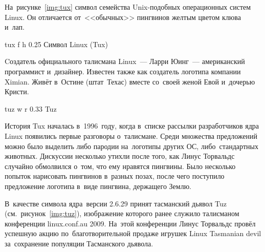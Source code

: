 \documentclass{bmstu}
\begin{document}



На~рисунке~\ref{img:tux} символ семейства Unix-подобных операционных систем Linux.
Он отличается от~<<обычных>> пингвинов желтым цветом клюва и~лап.

    {tux} %
    {f} %
    {h} %
    {0.25\textwidth} %
    {Символ Linux (Tux)} %

Cоздатель официального талисмана Linux~--- Ларри Юинг~--- американский программист и~дизайнер.
Известен также как создатель логотипа компании Ximian.
Живёт в~Остине (штат~Техас) вместе со~своей женой Евой и~дочерью Кристи.


    {tuz} %
    {w} %
    {r} %
    {0.33\textwidth} %
    {Tuz} %

История Tux началась в~1996~году, когда в~списке рассылки разработчиков ядра Linux появились первые разговоры о~талисмане.
Среди множества предложений можно было выделить либо пародии на~логотипы других ОС, либо~стандартных животных.
Дискуссии несколько утихли после того, как Линус Торвальдс случайно обмолвился о~том, что ему нравятся пингвины.
Было несколько попыток нарисовать пингвинов в~разных позах, после чего поступило предложение логотипа в~виде пингвина, держащего Землю.

В~качестве символа ядра~версии 2.6.29 принят тасманский дьявол Tuz (см.~рисунок~\ref{img:tuz}), изображение которого ранее служило талисманом конференции linux.conf.au 2009.
На~этой конференции Линус Торвальдс провёл успешную акцию по~благотворительной продаже игрушек Linux Tasmanian devil за~сохранение популяции Тасманского дьявола. \newpage




\end{document}
